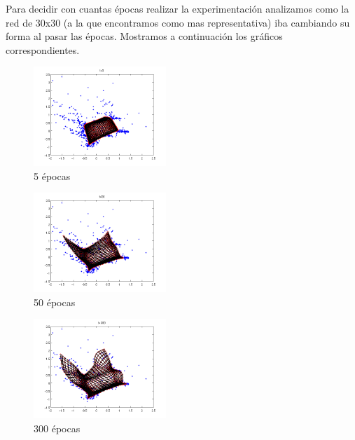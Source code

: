 \documentclass[informe.tex]{subfiles}
\begin{document}
       Para decidir con cuantas \'epocas realizar la experimentación analizamos como la red de 30x30 (a la que encontramos como mas representativa) iba cambiando su forma al pasar las \'epocas. Mostramos a continuación los gr\'aficos correspondientes.       
       
       \FloatBarrier
	\begin{minipage}{0.31\textwidth}
	  \centering
	  \begin{figure}[H]
	    \centering
	    \includegraphics[height=3.75cm,keepaspectratio]{graficos/tiempo/5.png}
		  \caption{\small 5 \'epocas}
	  \end{figure}
	  
	  \begin{figure}[H]
	    \centering
	    \includegraphics[height=3.75cm,keepaspectratio]{graficos/tiempo/50.png}
		  \caption{\small 50 \'epocas}
	  \end{figure}
	  
	  \begin{figure}[H]
	    \centering
	    \includegraphics[height=3.75cm,keepaspectratio]{graficos/tiempo/300.png}
		  \caption{\small 300 \'epocas}
	  \end{figure}
	\end{minipage}
\end{document}
